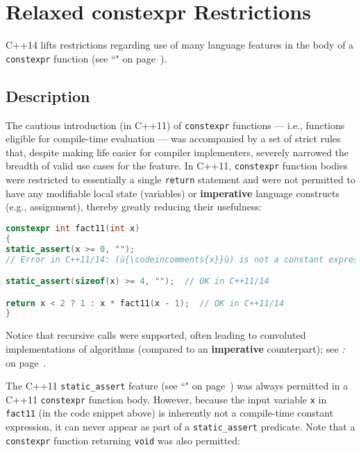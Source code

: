 \newpage
\section[Relaxed {\ttfamily constexpr} Restrictions]{Relaxed {\SecCode constexpr} Restrictions}\label{relaxed-constexpr-restrictions}

C++14 lifts restrictions regarding use of many language features in the
body of a \texttt{constexpr} function (see ``" on page~\pageref{constexprfunc}).

\subsection[Description]{Description}\label{description}

The cautious introduction (in C++11) of \texttt{constexpr}
functions --- i.e., functions eligible for compile-time evaluation
--- was accompanied by a set of strict rules that, despite making life
easier for compiler implementers, severely narrowed the breadth of valid
use cases for the feature. In C++11, \texttt{constexpr}
function bodies were restricted to essentially a single
\texttt{return} statement and were not permitted to have any modifiable
local state (variables) or \textbf{imperative} language constructs
(e.g., assignment), thereby greatly reducing their \mbox{usefulness}:

\begin{lstlisting}[language=C++]
constexpr int fact11(int x)
{
static_assert(x >= 0, "");
// Error in C++11/14: (ù{\codeincomments{x}}ù) is not a constant expression.

static_assert(sizeof(x) >= 4, "");  // OK in C++11/14

return x < 2 ? 1 : x * fact11(x - 1);  // OK in C++11/14
}
\end{lstlisting}

\noindent Notice that recursive calls were supported, often leading to convoluted
implementations of algorithms (compared to an \textbf{imperative}
counterpart); see \textit{: } on page~\pageref{non-recursive-constexpr-algorithms}.

The C++11 \texttt{static\_assert} feature (see ``" on page~\pageref{compile-time-assertions-(static_assert)}) was always
permitted in a C++11 \texttt{constexpr} function body.
However, because the input variable \texttt{x} in \texttt{fact11}
(in the code snippet above) is inherently not a compile-time constant expression, it can
never appear as part of a \texttt{static\_assert} predicate. Note that a
\texttt{constexpr} function returning \texttt{void} was also permitted:

